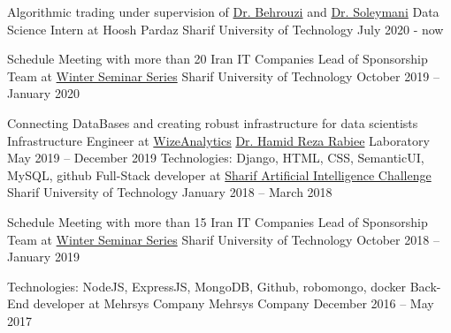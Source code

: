 
\begin{cventries}
	
  \cventry
  	{Algorithmic trading under supervision of \href{http://ee.sharif.edu/~behroozi}{Dr. Behrouzi} and \href{http://sharif.edu/~soleymani/}{Dr. Soleymani}}
  	{Data Science Intern at Hoosh Pardaz}
  	{Sharif University of Technology}
	{July 2020 - now}
	{}
	
  \cventry
	{Schedule Meeting with more than 20 Iran IT Companies}
	{Lead of Sponsorship Team at \href{https://wss.ce.sharif.edu/2019/staff/}{Winter Seminar Series}}
	{Sharif University of Technology}
	{October 2019 – January 2020}
	{}
	
  \cventry
	{Connecting DataBases and creating robust infrastructure for data scientists}
	{Infrastructure Engineer at \href{http://wizeanalytics.com/}{WizeAnalytics}}
	{\href{http://sharif.edu/~rabiee/}{Dr. Hamid Reza Rabiee} Laboratory}
	{May 2019 – December 2019}
	{}
  \cventry
    {Technologies: Django, HTML, CSS, SemanticUI, MySQL, github}
    {Full-Stack developer at \href{https://aichallenge.sharif.edu/}{Sharif Artificial Intelligence Challenge}}
    {Sharif University of Technology}
    {January 2018 – March 2018}
    {}
    
      \cventry
    {Schedule Meeting with more than 15 Iran IT Companies}
    {Lead of Sponsorship Team at \href{https://wss.ce.sharif.edu/2018/staff/}{Winter Seminar Series}}
    {Sharif University of Technology}
    {October 2018 – January 2019}
    {}
    
  \cventry
    {Technologies: NodeJS, ExpressJS, MongoDB, Github, robomongo, docker}
    {Back-End developer at Mehrsys Company}
    {Mehrsys Company}
    {December 2016 – May 2017}
    {}
    
  
\end{cventries}
